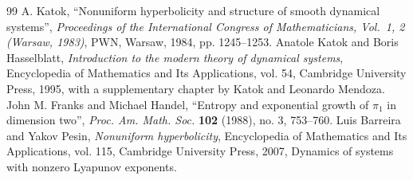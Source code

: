 \documentclass[10pt,a4paper]{amsart}
\numberwithin{equation}{section}
\theoremstyle{definition}
\theoremstyle{remark}
\begin{document}
\begin{thebibliography}{99}
 A. Katok, ``Nonuniform hyperbolicity and structure of smooth dynamical systems'', \emph{Proceedings of the International Congress of Mathematicians, Vol.\ 1, 2 (Warsaw, 1983)}, PWN, Warsaw, 1984, pp. 1245--1253.
 Anatole Katok and Boris Hasselblatt, \emph{Introduction to the modern theory of dynamical systems}, Encyclopedia of Mathematics and Its Applications, vol. 54, Cambridge University Press, 1995, with a supplementary chapter by Katok and Leonardo Mendoza.
 John M. Franks and Michael Handel, ``Entropy and exponential growth of $\pi_1$ in dimension two'', \emph{Proc. Am. Math. Soc.} \textbf{102} (1988), no. 3, 753--760.
 Luis Barreira and Yakov Pesin, \emph{Nonuniform hyperbolicity}, Encyclopedia of Mathematics and Its Applications, vol. 115, Cambridge University Press, 2007, Dynamics of systems with nonzero Lyapunov exponents.
\end{thebibliography}
\end{document}
